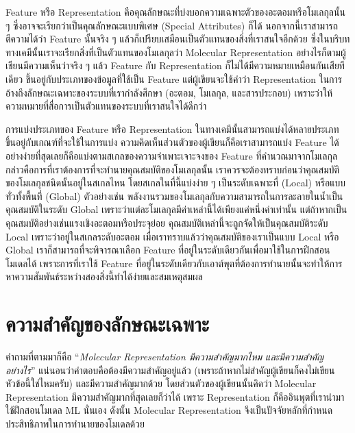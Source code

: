Feature หรือ Representation คือคุณลักษณะที่บ่งบอกความเฉพาะตัวของอะตอมหรือโมเลกุลนั้น ๆ ซึ่งอาจจะเรียกว่าเป็นคุณลักษณะแบบพิเศษ (Special Attributes) ก็ได้ นอกจากนี้เราสามารถตีความได้ว่า Feature นั้นจริง ๆ แล้วก็เปรียบเสมือนเป็นตัวแทนของสิ่งที่เราสนใจอีกด้วย ซึ่งในบริบททางเคมีนั้นเราจะเรียกสิ่งที่เป็นตัวแทนของโมเลกุลว่า Molecular Representation อย่างไรก็ตามผู้เขียนมีความเห็นว่าจริง ๆ แล้ว Feature กับ Representation ก็ไม่ได้มีความหมายเหมือนกันเสียทีเดียว ขึ้นอยู่กับประเภทของข้อมูลที่ใช้เป็น Feature แต่ผู้เขียนจะใช้คำว่า Representation ในการอ้างถึงลักษณะเฉพาะของระบบที่เรากำลังศึกษา (อะตอม, โมเลกุล, และสารประกอบ) เพราะว่าให้ความหมายที่สื่อการเป็นตัวแทนของระบบที่เราสนใจได้ดีกว่า\autocite{stepisnik2021}

การแบ่งประเภทของ Feature หรือ Representation ในทางเคมีนั้นสามารถแบ่งได้หลายประเภท ขึ้นอยู่กับเกณฑ์ที่จะใช้ในการแบ่ง ความคิดเห็นส่วนตัวของผู้เขียนก็คือเราสามารถแบ่ง Feature ได้อย่างง่ายที่สุดเลยก็คือแบ่งตามสเกลของความจำเพาะเจาะจงของ Feature ที่คำนวณมาจากโมเลกุล กล่าวคือการที่เราต้องการที่จะทำนายคุณสมบัติของโมเลกุลนั้น เราควรจะต้องทราบก่อนว่าคุณสมบัติของโมเลกุลชนิดนั้นอยู่ในสเกลไหน โดยสเกลในที่นี้แบ่งง่าย ๆ เป็นระดับเฉพาะที่ (Local) หรือแบบทั่วทั้งพื้นที่ (Global) ตัวอย่างเช่น พลังงานรวมของโมเลกุลกับความสามารถในการละลายในน้ำเป็นคุณสมบัติในระดับ Global เพราะว่าแต่ละโมเลกุลมีค่าเหล่านี้ได้เพียงแค่หนึ่งค่าเท่านั้น แต่ถ้าหากเป็นคุณสมบัติอย่างเช่นแรงเชิงอะตอมหรือประจุย่อย คุณสมบัติเหล่านี้จะถูกจัดให้เป็นคุณสมบัติระดับ Local เพราะว่าอยู่ในสเกลระดับอะตอม เมื่อเราทราบแล้วว่าคุณสมบัติของเราเป็นแบบ Local หรือ Global เราก็สามารถที่จะพิจารณาเลือก Feature ที่อยู่ในระดับเดียวกันเพื่อมาใช้ในการฝึกสอนโมเดลได้ เพราะการที่เราใช้ Feature ที่อยู่ในระดับเดียวกับเอาต์พุตที่ต้องการทำนายนั้นจะทำให้การหาความสัมพันธ์ระหว่างสองสิ่งนี้ทำได้ง่ายและสมเหตุสมผล

\section{ความสำคัญของลักษณะเฉพาะ}
\label{sec:why_feature}

คำถามที่ตามมาก็คือ \enquote{\textit{Molecular Representation มีความสำคัญมากไหม และมีความสำคัญอย่างไร}} แน่นอนว่าคำตอบคือต้องมีความสำคัญอยู่แล้ว (เพราะถ้าหากไม่สำคัญผู้เขียนก็คงไม่เขียนหัวข้อนี้ใช่ไหมครับ) และมีความสำคัญมากด้วย โดยส่วนตัวของผู้เขียนนั้นคิดว่า Molecular Representation มีความสำคัญมากที่สุดเลยก็ว่าได้ เพราะ Representation ก็คืออินพุตที่เรานำมาใช้ฝึกสอนโมเดล ML นั่นเอง ดังนั้น Molecular Representation จึงเป็นปัจจัยหลักที่กำหนดประสิทธิภาพในการทำนายของโมเดลด้วย

